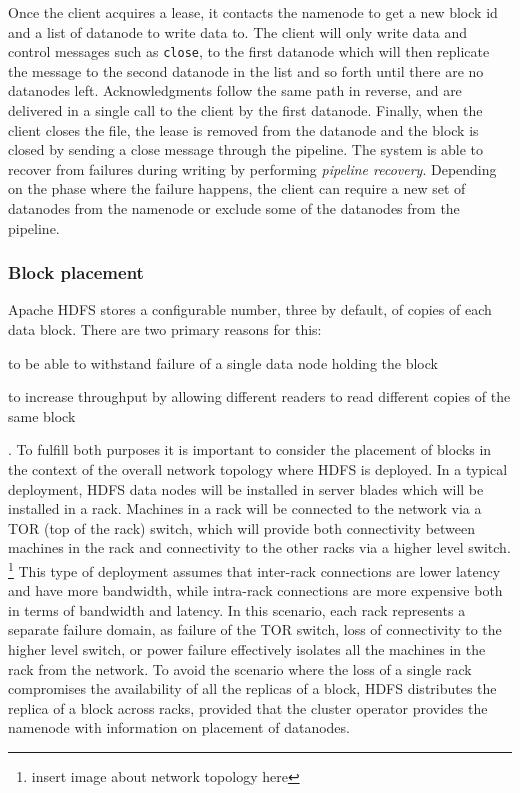 Once the client acquires a lease, it contacts the namenode to get a new block id and a list of datanode to write data to.
The client will only write data and control messages such as \texttt{close}, to the first datanode which will then replicate the message to the second datanode in the list and so forth until there are no datanodes left.
Acknowledgments follow the same path in reverse, and are delivered in a single call to the client by the first datanode.
Finally, when the client closes the file, the lease is removed from the datanode and the block is closed by sending a close message through the pipeline.
The system is able to recover from failures during writing by performing \textit{pipeline recovery}.
Depending on the phase where the failure happens, the client can require a new set of datanodes from the namenode or exclude some of the datanodes from the pipeline.

\subsubsection{Block placement}
\label{sec:block-placement}
Apache HDFS stores a configurable number, three by default, of copies of each data block.
There are two primary reasons for this:
\begin{inparaenum}[i)]
\item to be able to withstand failure of a single data node holding the block
\item to increase throughput by allowing different readers to read different copies of the same block
\end{inparaenum}.
To fulfill both purposes it is important to consider the placement of blocks in the context of the overall network topology where HDFS is deployed.
In a typical deployment, HDFS data nodes will be installed in server blades which will be installed in a rack.
Machines in a rack will be connected to the network via a TOR (top of the rack) switch, which will provide both connectivity between machines in the rack and connectivity to the other racks via a higher level switch. \footnote{insert image about network topology here} 
This type of deployment assumes that inter-rack connections are lower latency and have more bandwidth, while intra-rack connections are more expensive both in terms of bandwidth and latency.
In this scenario, each rack represents a separate failure domain, as failure of the TOR switch, loss of connectivity to the higher level switch, or power failure effectively isolates all the machines in the rack from the network.
To avoid the scenario where the loss of a single rack compromises the availability of all the replicas of a block, HDFS distributes the replica of a block across racks, provided that the cluster operator provides the namenode with information on placement of datanodes.

